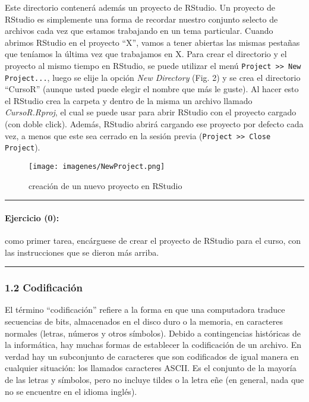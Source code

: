 \documentclass[]{article}
\makeatletter
\def\maxwidth{\ifdim\Gin@nat@width>\linewidth\linewidth
\else\Gin@nat@width\fi}
\let\Oldincludegraphics\includegraphics
\renewcommand{\includegraphics}[1]{\Oldincludegraphics[width=\maxwidth]{#1}}
\makeatother
\begin{document}
Este directorio contenerá además un proyecto de RStudio. Un proyecto de
RStudio es simplemente una forma de recordar nuestro conjunto selecto de
archivos cada vez que estamos trabajando en un tema particular. Cuando
abrimos RStudio en el proyecto ``X'', vamos a tener abiertas las mismas
pestañas que teníamos la última vez que trabajamos en X. Para crear el
directorio y el proyecto al mismo tiempo en RStudio, se puede utilizar
el menú \texttt{Project \textgreater{}\textgreater{} New Project...},
luego se elije la opción \emph{New Directory} (Fig. 2) y se crea el
directorio ``CursoR'' (aunque usted puede elegir el nombre que más le
guste). Al hacer esto el RStudio crea la carpeta y dentro de la misma un
archivo llamado \emph{CursoR.Rproj}, el cual se puede usar para abrir
RStudio con el proyecto cargado (con doble click). Además, RStudio
abrirá cargando ese proyecto por defecto cada vez, a menos que este sea
cerrado en la sesión previa
(\texttt{Project \textgreater{}\textgreater{} Close Project}).

\begin{figure}[htbp]
\centering
\texttt{[image: imagenes/NewProject.png]}
\caption{creación de un nuevo proyecto en RStudio}
\end{figure}

\begin{center}\rule{3in}{0.4pt}\end{center}

\paragraph{Ejercicio (0):}

como primer tarea, encárguese de crear el proyecto de RStudio para el
curso, con las instrucciones que se dieron más arriba.

\begin{center}\rule{3in}{0.4pt}\end{center}

\subsubsection{1.2 Codificación}

El término ``codificación'' refiere a la forma en que una computadora
traduce secuencias de bits, almacenados en el disco duro o la memoria,
en caracteres normales (letras, números y otros símbolos). Debido a
contingencias históricas de la informática, hay muchas formas de
establecer la codificación de un archivo. En verdad hay un subconjunto
de caracteres que son codificados de igual manera en cualquier
situación: los llamados caracteres ASCII. Es el conjunto de la mayoría
de las letras y símbolos, pero no incluye tildes o la letra eñe (en
general, nada que no se encuentre en el idioma inglés).
\end{document}
